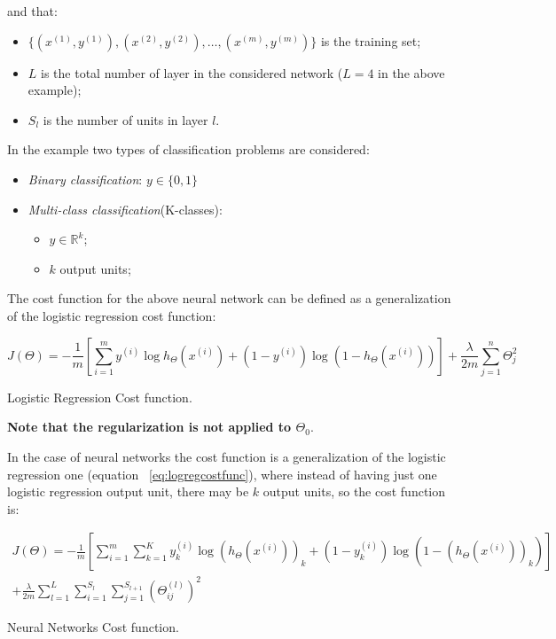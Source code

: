 and that:
\begin{itemize}
	\item $\{ (x^{(1)},y^{(1)}), (x^{(2)},y^{(2)}), \hdots, (x^{(m)},y^{(m)}) \}$ is the training set;
	\item $L$ is the total number of layer in the considered network ($L = 4$ in the above example);
	\item $S_l$ is the number of units in layer $l$.\\
\end{itemize}

In the example two types of classification problems are considered:
\begin{itemize}
	\item {\it Binary classification}: $y \in \{0,1\} $
	\item {\it Multi-class classification}(K-classes):
	\begin{itemize}
		\item $y \in \mathbb{R}^k$;
		\item $k$ output units;
	\end{itemize}
\end{itemize}


The cost function for the above neural network can be defined as a generalization of the logistic regression cost function:



\begin{eqfloat}[H]
\begin{equation}
	J(\Theta)  = -\frac{1}{m}[ \sum_{i=1}^{m} y^{(i)} \log h_\Theta(x^{(i)}) + (1 - y^{(i)}) \log (1 - h_\Theta(x^{(i)}) )] + \frac{\lambda}{2m}\sum_{j=1}^{n} \Theta_j^2
\end{equation}
      \addtocounter{equation}{-1}
        \caption{ Logistic Regression Cost function.}
        \label{eq:logregcostfunc}
    \end{eqfloat}


{\bf Note that the regularization is not applied to $\Theta_0$}.

In the case of neural networks the cost function  is a generalization of the logistic regression one (equation ~\ref{eq:logregcostfunc}), where instead of having just one logistic regression output unit, there may be $k$ output units, so the cost function is:


\begin{eqfloat}[H]
\begin{equation}
\begin{aligned}
J(\Theta)  = -\frac{1}{m}[ \sum_{i=1}^{m} \sum_{k=1}^{K} y^{(i)}_k \log (h_\Theta(x^{(i)}))_k + (1 - y^{(i)}_k) \log (1 - (h_\Theta(x^{(i)}) )_k)] \\ 
+ \frac{\lambda}{2m} 
\sum_{l=1}^{L} 
\sum_{i=1}^{S_l} 
\sum_{j=1}^{S_{l+1}} (\Theta_{ij}^{(l)})^2
\end{aligned}
\end{equation}
      \addtocounter{equation}{-1}
        \caption{ Neural Networks Cost function.}
        \label{eq:nncostfunc}
    \end{eqfloat}



